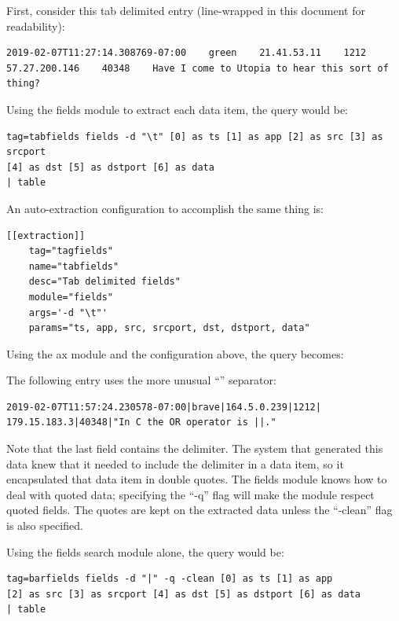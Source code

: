 First, consider this tab delimited entry (line-wrapped in this document for readability):

\begin{Verbatim}[breaklines=true]
2019-02-07T11:27:14.308769-07:00    green    21.41.53.11    1212    
57.27.200.146    40348    Have I come to Utopia to hear this sort of thing?
\end{Verbatim}

Using the fields module to extract each data item, the query would be:

\begin{Verbatim}[breaklines=true]
tag=tabfields fields -d "\t" [0] as ts [1] as app [2] as src [3] as srcport
[4] as dst [5] as dstport [6] as data
| table
\end{Verbatim}

An auto-extraction configuration to accomplish the same thing is:

\begin{Verbatim}[breaklines=true]
[[extraction]]
    tag="tagfields"
    name="tabfields"
    desc="Tab delimited fields"
    module="fields"
    args='-d "\t"'
    params="ts, app, src, srcport, dst, dstport, data"
\end{Verbatim}

Using the ax module and the configuration above, the query becomes:


The following entry uses the more unusual ``\textbar{}'' separator:

\begin{Verbatim}[breaklines=true]
2019-02-07T11:57:24.230578-07:00|brave|164.5.0.239|1212|
179.15.183.3|40348|"In C the OR operator is ||."
\end{Verbatim}

Note that the last field contains the delimiter. The system that
generated this data knew that it needed to include the delimiter in a
data item, so it encapsulated that data item in double quotes. The
fields module knows how to deal with quoted data; specifying the ``-q''
flag will make the module respect quoted fields. The quotes are kept on
the extracted data unless the ``-clean'' flag is also specified.

Using the fields search module alone, the query would be:

\begin{Verbatim}[breaklines=true]
tag=barfields fields -d "|" -q -clean [0] as ts [1] as app 
[2] as src [3] as srcport [4] as dst [5] as dstport [6] as data
| table
\end{Verbatim}

